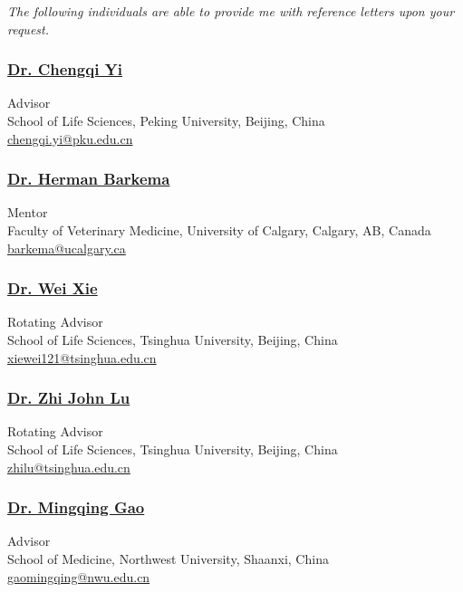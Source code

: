 \textit{The following individuals are able to provide me with reference letters upon your request.}

\subsubsection*{\href{https://www.bio.pku.edu.cn/enhomes/news/teacher_dis/91.html}{Dr. Chengqi Yi}}
Advisor\\
School of Life Sciences, Peking University, Beijing, China\\
\href{mailto:chengqi.yi@pku.edu.cn}{chengqi.yi@pku.edu.cn}\\

\subsubsection*{\href{https://profiles.ucalgary.ca/herman-barkema}{Dr. Herman Barkema}}
Mentor\\
Faculty of Veterinary Medicine, University of Calgary, Calgary, AB, Canada\\
\href{mailto:barkema@ucalgary.ca}{barkema@ucalgary.ca}\\

\subsubsection*{\href{https://life.tsinghua.edu.cn/lifeen/info/1034/1077.htm}{Dr. Wei Xie}}
Rotating Advisor\\
School of Life Sciences, Tsinghua University, Beijing, China\\
\href{mailto:xiewei121@tsinghua.edu.cn}{xiewei121@tsinghua.edu.cn}\\



\subsubsection*{\href{https://life.tsinghua.edu.cn/lifeen/info/1034/1083.htm}{Dr. Zhi John Lu}}
Rotating Advisor\\
School of Life Sciences, Tsinghua University, Beijing, China\\
\href{mailto:zhilu@tsinghua.edu.cn}{zhilu@tsinghua.edu.cn}\\


\subsubsection*{\href{https://faculty.nwu.edu.cn/gaomingqing/zh_CN/index.htm}{Dr. Mingqing Gao}}
Advisor\\
School of Medicine, Northwest University, Shaanxi, China\\
\href{mailto:gaomingqing@nwu.edu.cn}{gaomingqing@nwu.edu.cn}\\



